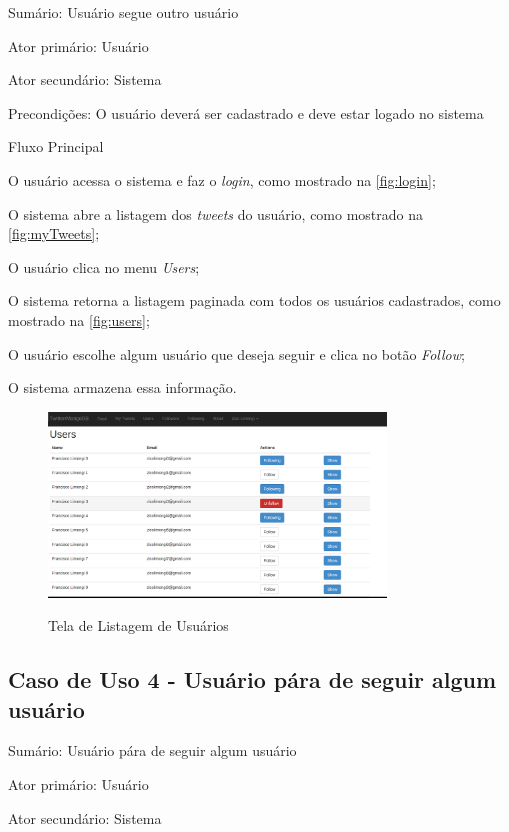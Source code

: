Sumário: Usuário segue outro usuário

Ator primário: Usuário

Ator secundário: Sistema

Precondições: O usuário deverá ser cadastrado e deve estar logado no sistema

Fluxo Principal
\begin{enumerate}
{\setlength\itemindent{25pt}
\item O usuário acessa o sistema e faz o \textit{login}, como mostrado na \autoref{fig:login};
\item O sistema abre a listagem dos \textit{tweets} do usuário, como mostrado na \autoref{fig:myTweets};
\item O usuário clica no menu \textit{Users};
\item O sistema retorna a listagem paginada com todos os usuários cadastrados, como mostrado na \autoref{fig:users};
\item O usuário escolhe algum usuário que deseja seguir e clica no botão \textit{Follow};
\item O sistema armazena essa informação.
}
\end{enumerate}

\begin{figure}[H]
    \centering
    \caption{Tela de Listagem de Usuários}
    \includegraphics[width=0.8\textwidth]{./04-figuras/users.png}
    \label{fig:users}
\end{figure}

\subsection{Caso de Uso 4 - Usuário pára de seguir algum usuário}
\label{subsec:useCaseUserUnfollow}

Sumário: Usuário pára de seguir algum usuário

Ator primário: Usuário

Ator secundário: Sistema

